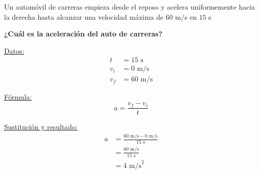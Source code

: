 \question[10] Un automóvil de carreras empieza desde el reposo y acelera uniformemente hacia la derecha hasta alcanzar 
una velocidad máxima de $60$ m/s en $15$ s

\textbf{¿Cuál es la aceleración del auto de carreras?}

\begin{minipage}[c]{\linewidth}
    \begin{solutionbox}{4.5cm}
        \begin{minipage}[t]{0.3\textwidth}
            \centering
            \underline{Datos:}
            \begin{align*}
                t   & =  15 \text{ s}  \\
                v_i & = 0  \text{ m/s} \\
                v_f & = 60  \text{ m/s}
            \end{align*}
        \end{minipage}%
        \begin{minipage}[t]{0.3\textwidth}
            \centering
            \underline{F\'ormula:}
            \begin{equation*}
                a=\frac{v_f-v_i}{t}
            \end{equation*}
        \end{minipage}
        \begin{minipage}[t]{0.3\textwidth}
            \centering
            \underline{Sustituci\'on y resultado:}
            \begin{align*}
                a & =\frac{60 \text{ m/s}-0 \text{ m/s}}{15 \text{ s}} \\
                  & = \frac{60 \text{ m/s}}{15 \text{ s}}             \\
                  & =4 \text{ m/s}^2
            \end{align*}
        \end{minipage}
    \end{solutionbox}
\end{minipage}
